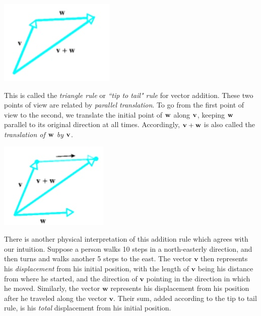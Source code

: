 \documentclass[12pt,letterpaper,reqno]{article}
\numberwithin{equation}{section}
\newcommand{\ti}[1]{\textit{#1}}
\begin{document}
\begin{center}
	\includegraphics[scale=0.5]{figures_mvc/tip_to_tail}
\end{center}
This is called the \ti{triangle rule} or \ti{``tip to tail" rule} for vector addition. These two points of view are related by \ti{parallel translation}. To go from the first point of view to the second, we translate the initial point of ${\bf w}$ along ${\bf v}$, keeping ${\bf w}$ parallel to its original direction at all times. Accordingly, ${\bf v}+{\bf w}$ is also called the \ti{translation of ${\bf w}$ by ${\bf v}$}.
\begin{center}
	\includegraphics[scale=0.5]{figures_mvc/translation_of_v_by_w}
\end{center}

\begin{example}
There is another physical interpretation of this addition rule which agrees with our intuition. Suppose a person walks 10 steps in a north-easterly direction, and then turns and walks another 5 steps to the east. The vector $\mathbf{v}$ then represents his \emph{displacement} from his initial position, with the length of $\mathbf{v}$ being his distance from where he started, and the direction of $\mathbf{v}$ pointing in the direction in which he moved. Similarly, the vector $\mathbf{w}$ represents his displacement from his position after he traveled along the vector $\mathbf{v}$. Their sum, added according to the tip to tail rule, is his \emph{total} displacement from his initial position.	
\end{example}
\end{document}
